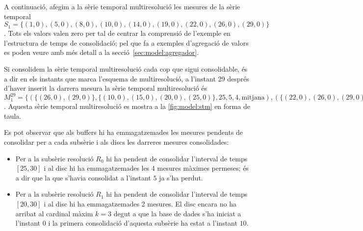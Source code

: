 \begin{example} 
A continuació, afegim a la sèrie temporal multiresolució les mesures
de la sèrie temporal $S_1=\{
(1,0),(5,0),(8,0),(10,0),(14,0),(19,0),(22,0),(26,0),(29,0) \}$. Tots
els valors valen zero per tal de centrar la comprensió de l'exemple en
l'estructura de temps de consolidació; pel que fa a exemples
d'agregació de valors es poden veure amb més detall a la
secció~\ref{sec:model:agregador}.


Si consolidem la sèrie temporal multiresolució cada cop que sigui
consolidable, és a dir en els instants que marca l'esquema de
multiresolució, a l'instant 29 després d'haver inserit la darrera
mesura la sèrie temporal multiresolució és $M_1^{29} = \{ (
\{(26,0),(29,0)\},\{(10,0),(15,0),(20,0),(25,0)\}, 25 , 5 ,4 ,
\text{mitjana} ), ( \{(22,0),(26,0),(29,0)\}, \{(10,0),(20,0)\},
20 , 10 ,3 , \text{mitjana} ) \}$.  Aquesta sèrie temporal
multiresolució es mostra a la \autoref{fig:model:stm} en forma de
taula.


Es pot observar que als buffers hi ha emmagatzemades les mesures
pendents de consolidar per a cada subsèrie i als discs les darreres
mesures consolidades:
\begin{itemize}
\item Per a la subsèrie resolució $R_0$ hi ha pendent de consolidar
  l'interval de temps $[25,30]$ i al disc hi ha emmagatzemades les 4
  mesures màximes permeses; és a dir que la que s'havia consolidat a
  l'instant $5$ ja s'ha perdut.
\item Per a la subsèrie resolució $R_1$ hi ha pendent de consolidar
  l'interval de temps $[20,30]$ i al disc hi ha emmagatzemades 2
  mesures. El disc encara no ha arribat al cardinal màxim $k=3$ degut
  a que la base de dades s'ha iniciat a l'instant $0$ i la primera
  consolidació d'aquesta subsèrie ha estat a l'instant $10$.
\end{itemize}





\end{example}
